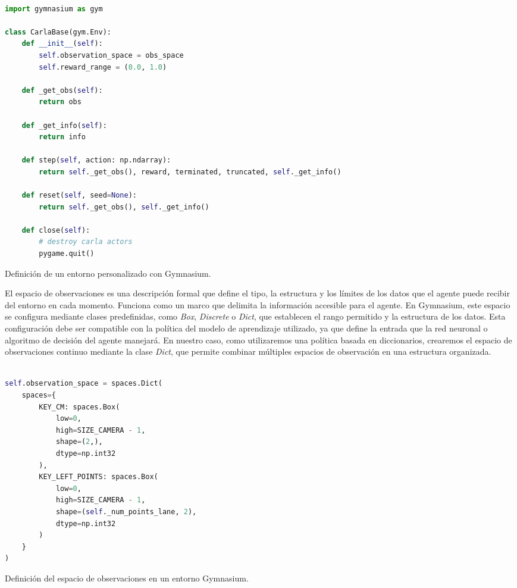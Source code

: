 \begin{code}[h]
\begin{lstlisting}[language=Python]

import gymnasium as gym

class CarlaBase(gym.Env):
    def __init__(self):
        self.observation_space = obs_space
        self.reward_range = (0.0, 1.0)
    
    def _get_obs(self):
        return obs
    
    def _get_info(self):
        return info
    
    def step(self, action: np.ndarray):
        return self._get_obs(), reward, terminated, truncated, self._get_info()
   
    def reset(self, seed=None):
        return self._get_obs(), self._get_info()
    
    def close(self):
        # destroy carla actors
        pygame.quit()

\end{lstlisting}
\caption[Definición de un entorno personalizado en Gymnasium]{Definición de un entorno personalizado con Gymnasium.}
\label{cod:gym}
\end{code}

El espacio de observaciones es una descripción formal que define el tipo, la estructura y los límites de los datos que el agente puede recibir del entorno en cada momento. Funciona como un marco que delimita la información accesible para el agente. En Gymnasium, este espacio se configura mediante clases predefinidas, como \textit{Box}, \textit{Discrete} o \textit{Dict}, que establecen el rango permitido y la estructura de los datos. Esta configuración debe ser compatible con la política del modelo de aprendizaje utilizado, ya que define la entrada que la red neuronal o algoritmo de decisión del agente manejará. En nuestro caso, como utilizaremos una política basada en diccionarios, crearemos el espacio de observaciones continuo mediante la clase \textit{Dict}, que permite combinar múltiples espacios de observación en una estructura organizada.

\begin{code}[h]
\begin{lstlisting}[language=Python]

self.observation_space = spaces.Dict(
	spaces={
		KEY_CM: spaces.Box(
			low=0,
			high=SIZE_CAMERA - 1,
			shape=(2,),
			dtype=np.int32
		),
		KEY_LEFT_POINTS: spaces.Box(
			low=0,
			high=SIZE_CAMERA - 1,
			shape=(self._num_points_lane, 2),
			dtype=np.int32
		)
	}
)


\end{lstlisting}
\caption[Definición del espacio de observaciones en un entorno Gymnasium]{Definición del espacio de observaciones en un entorno Gymnasium.}
\label{cod:gymobs}
\end{code}


